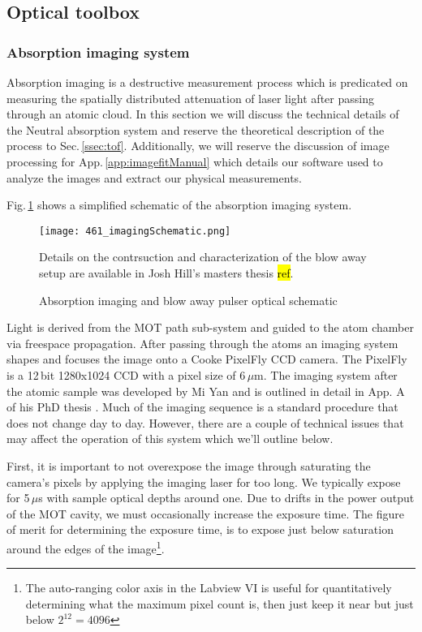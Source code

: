 \subsection{Optical toolbox} \label{ssec:op_tools}
\subsubsection{Absorption imaging system}
Absorption imaging is a destructive measurement process which is predicated on measuring the spatially distributed attenuation of laser light after passing through an atomic cloud. 
In this section we will discuss the technical details of the Neutral absorption system and reserve the theoretical description of the process to Sec.\,\ref{ssec:tof}.
Additionally, we will reserve the discussion of image processing for App.\,\ref{app:imagefitManual} which details our software used to analyze the images and extract our physical measurements.

Fig.\,\ref{fig:absImagingSchematic} shows a simplified schematic of the absorption imaging system.
	\begin{figure} 
		\centerline{
		\texttt{[image: 461\_imagingSchematic.png]}}
		\caption{Absorption imaging and blow away pulser optical schematic}{Details on the contrsuction and characterization of the blow away setup are available in Josh Hill's masters thesis \hl{ref}.}
		\label{fig:absImagingSchematic}
	\end{figure}
Light is derived from the MOT path sub-system and guided to the atom chamber via freespace propagation. 
After passing through the atoms an imaging system shapes and focuses the image onto a Cooke PixelFly CCD camera.
The PixelFly is a 12\,bit 1280x1024 CCD with a pixel size of 6\,$\mu$m.
The imaging system after the atomic sample was developed by Mi Yan and is outlined in detail in App. A of his PhD thesis \cite{Yan2013d}. 
Much of the imaging sequence is a standard procedure that does not change day to day.
However, there are a couple of technical issues that may affect the operation of this system which we'll outline below.

First, it is important to not overexpose the image through saturating the camera's pixels by applying the imaging laser for too long.
We typically expose for 5\,$\mu$s with sample optical depths around one.
Due to drifts in the power output of the MOT cavity, we must occasionally increase the exposure time.
The figure of merit for determining the exposure time, is to expose just below saturation around the edges of the image\footnote{The auto-ranging color axis in the Labview VI is useful for quantitatively determining what the maximum pixel count is, then just keep it near but just below $2^{12}=4096$}.

